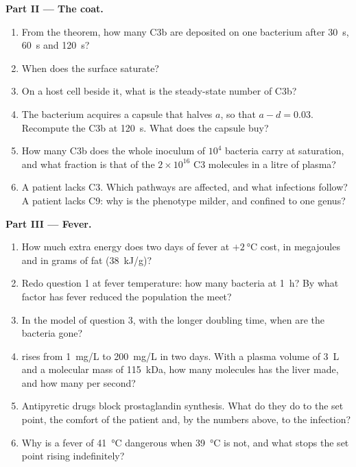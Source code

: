 \begin{problem}
\medskip
\noindent\textbf{Part II --- The coat.}
\begin{enumerate}[resume]
  \item From the theorem, how many C3b are deposited on one bacterium
        after \qty{30}{s}, \qty{60}{s} and \qty{120}{s}?
  \item When does the surface saturate?
  \item On a host cell beside it, what is the steady-state number of
        C3b?
  \item The bacterium acquires a capsule that halves $a$, so that $a -
        d = 0.03$. Recompute the C3b at \qty{120}{s}. What does the
        capsule buy?
  \item How many C3b does the whole inoculum of $10^{4}$ bacteria
        carry at saturation, and what fraction is that of the
        $2\times 10^{16}$ C3 molecules in a litre of plasma?
  \item A patient lacks C3. Which pathways are affected, and what
        infections follow? A patient lacks C9: why is the phenotype
        milder, and confined to one genus?
\end{enumerate}

\medskip
\noindent\textbf{Part III --- Fever.}
\begin{enumerate}[resume]
  \item How much extra energy does two days of fever at
        $+\qty{2}{\celsius}$ cost, in megajoules and in grams of fat
        (\qty{38}{kJ/g})?
  \item Redo question 1 at fever temperature: how many bacteria at
        \qty{1}{h}? By what factor has fever reduced the population the
         meet?
  \item In the model of question 3, with the longer doubling time,
        when are the bacteria gone?
  \item {} rises from \qty{1}{mg/L} to \qty{200}{mg/L} in
        two days. With a plasma volume of \qty{3}{L} and a molecular
        mass of \qty{115}{kDa}, how many molecules has the liver made,
        and how many per second?
  \item Antipyretic drugs block prostaglandin synthesis. What do they
        do to the set point, the comfort of the patient and, by the
        numbers above, to the infection?
  \item Why is a fever of \qty{41}{\celsius} dangerous when
        \qty{39}{\celsius} is not, and what stops the set point rising
        indefinitely?
\end{enumerate}


\end{problem}
